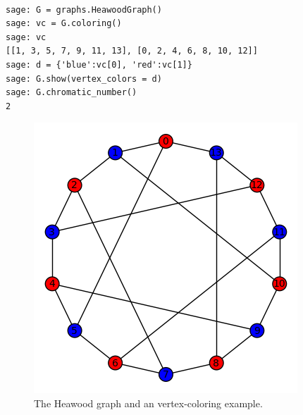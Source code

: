 \begin{example}
\begin{verbatim}

sage: G = graphs.HeawoodGraph()
sage: vc = G.coloring()
sage: vc
[[1, 3, 5, 7, 9, 11, 13], [0, 2, 4, 6, 8, 10, 12]]
sage: d = {'blue':vc[0], 'red':vc[1]}
sage: G.show(vertex_colors = d)       
sage: G.chromatic_number()
2

\end{verbatim}


\begin{figure}[!htbp]
\centering
{}
\includegraphics[scale=0.7]{image/graph-coloring/heawood-graph-vertex-coloring-example}
\caption{The Heawood graph and an vertex-coloring example.}
\label{fig:graph-coloring:heawood-graph-vertex-coloring-example}
\end{figure}


\end{example}


